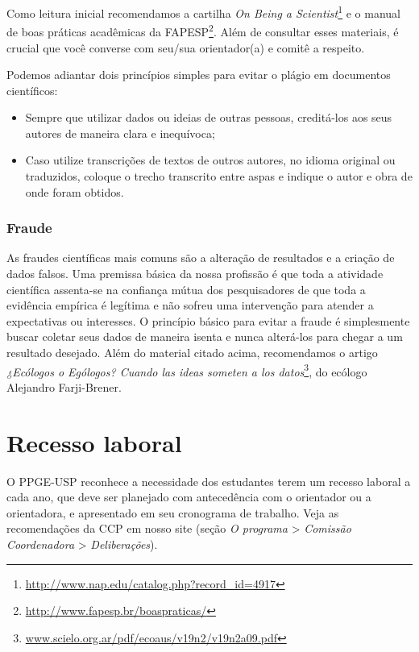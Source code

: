 Como leitura inicial recomendamos a cartilha \emph{On Being a
  Scientist}\footnote{\url{http://www.nap.edu/catalog.php?record_id=4917}}
e o manual de boas práticas acadêmicas da
FAPESP\footnote{\url{http://www.fapesp.br/boaspraticas/}}. Além de
consultar esses materiais, é crucial que você converse com seu/sua
orientador(a) e comitê a respeito.

Podemos adiantar dois princípios simples para evitar o plágio em documentos científicos:

\begin{itemize}
\item Sempre que utilizar dados ou ideias de outras pessoas,
  creditá-los aos seus autores de maneira clara e inequívoca;
\item Caso utilize transcrições de textos de outros autores, no idioma
  original ou traduzidos, coloque o trecho transcrito entre aspas e
  indique o autor e obra de onde foram obtidos.
\end{itemize}


\subsubsection{Fraude}
\label{sec:fraude}

As fraudes científicas mais comuns são a alteração de resultados e a
criação de dados falsos. Uma premissa básica da nossa profissão é que
toda a atividade científica assenta-se na confiança mútua dos
pesquisadores de que toda a evidência empírica é legítima e não sofreu
uma intervenção para atender a expectativas ou interesses. O princípio
básico para evitar a fraude é simplesmente buscar coletar seus dados
de maneira isenta e nunca alterá-los para chegar a um resultado
desejado.  Além do material citado acima, recomendamos o artigo
\emph{¿Ecólogos o Ególogos? Cuando las ideas someten a los
  datos}\footnote{\url{www.scielo.org.ar/pdf/ecoaus/v19n2/v19n2a09.pdf}},
do ecólogo Alejandro Farji-Brener.

\section{Recesso laboral}
\label{sec:recesso-laboral}
O PPGE-USP reconhece a necessidade dos estudantes terem um recesso
laboral a cada ano, que deve ser planejado com antecedência com o
orientador ou a orientadora, e apresentado em seu
cronograma de trabalho. Veja as recomendações da CCP em nosso site
(seção \emph{O programa} \textgreater{} \emph{Comissão Coordenadora}
\textgreater{} \emph{Deliberações}).

